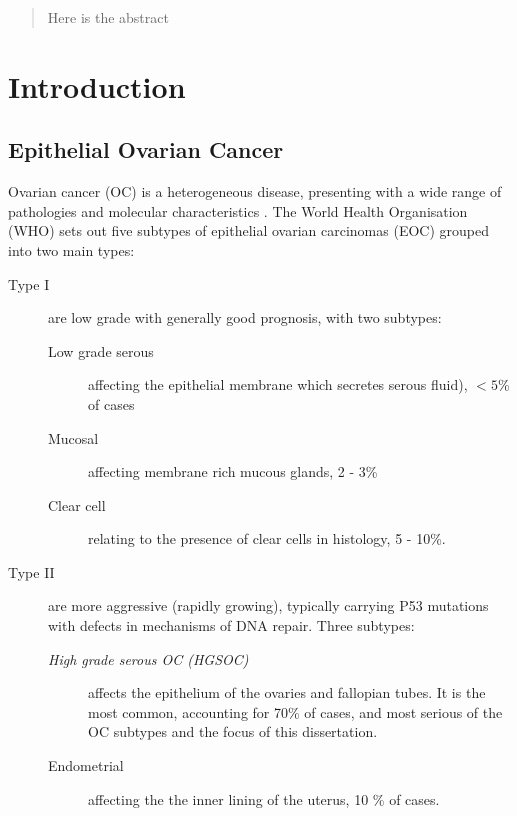 \documentclass[draft, tikz, 12pt,a4paper,oneside,fleqn]{article}
\begin{document}
\newpage
\setcounter{page}{1}

\tableofcontents

\newpage


\begin{abstract}
Here is the abstract
\end{abstract}
\newpage


\section{Introduction}

\subsection{Epithelial Ovarian Cancer}

Ovarian cancer (OC) is a heterogeneous disease, presenting with a wide range of pathologies and molecular characteristics .  The World Health Organisation (WHO) sets out five subtypes of epithelial ovarian carcinomas (EOC) grouped into two main types\cite{Kossai2018, Lisio2019}: 

\begin{description}
\item[Type I] are low grade with generally good prognosis, with two subtypes:
\begin{description}
\item[Low grade serous] affecting the epithelial membrane which secretes serous fluid), $< 5$\% of cases
\item[Mucosal] affecting membrane rich mucous glands, 2 - 3\% 
\item[Clear cell] relating to the presence of clear cells in histology, 5 - 10\%.
\end{description}
\item[Type II] are more aggressive (rapidly growing), typically carrying P53 mutations with defects in mechanisms of DNA repair. Three subtypes:
\begin{description}
\item[\emph{High grade serous OC (HGSOC)}] affects the epithelium of the ovaries and fallopian tubes.  It is the most common, accounting for 70\% of cases, and most serious of the OC subtypes and the focus of this dissertation.
\item[Endometrial] affecting the the inner lining of the uterus, 10 \% of cases.
\end{description}
\end{description}
\end{document}
